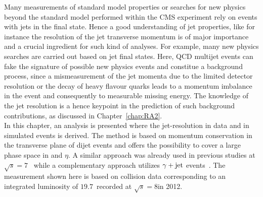 Many measurements of standard model properties or searches for new physics beyond the standard model performed within the CMS experiment rely on events with jets in the final state. Hence a good understanding of jet properties, like for instance the resolution of the jet transverse momentum is of major importance and a crucial ingredient for such kind of analyses. For example, many new physics searches are carried out based on jet final states. Here, QCD multijet events can fake the signature of possible new physics events and constitue a background process, since a mismeasurement of the jet momenta due to the limited detector resolution or the decay of heavy flavour quarks leads to a momentum imbalance in the event and consequently to measurable missing energy. The knowledge of the jet resolution is a hence keypoint in the prediction of such background contributions, as discussed in Chapter~\ref{chap:RA2}. \\
In this chapter, an analysis is presented where the jet-\pt resolution in data and in simulated events is derived. The method is based on momentum conservation in the transverse plane of dijet events and offers the possibility to cover a large phase space in \pt and $\eta$. A similar approach was already used in previous studies at $\sqrt{s}=7$\tev~\cite{1748-0221-6-11-P11002, thesis:Schroeder} while a complementary approach utilizes $\gamma +\rm{jet}$ events~\cite{CMS-AN-2010-141, CMS-AN-2011-004, CMS-AN-2013-179}. The measurement shown here is based on collision data corresponding to an integrated luminosity of $19.7$~\fbinv recorded at $\sqrt{s}=8$\tev in 2012.
